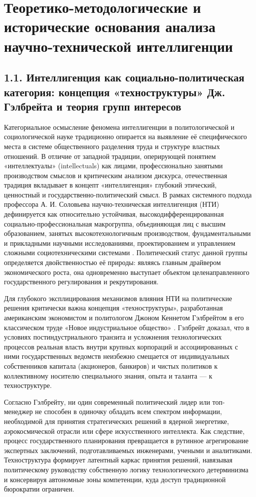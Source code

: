\section{Теоретико-методологические и исторические основания анализа научно-технической интеллигенции}

\subsection{1.1. Интеллигенция как социально-политическая категория: концепция «техноструктуры» Дж. Гэлбрейта и теория групп интересов}

Категориальное осмысление феномена интеллигенции в политологической и социологической науке традиционно опирается на выявление её специфического места в системе общественного разделения труда и структуре властных отношений. В отличие от западной традиции, оперирующей понятием «интеллектуалы» (intellectuals) как лицами, профессионально занятыми производством смыслов и критическим анализом дискурса, отечественная традиция вкладывает в концепт «интеллигенция» глубокий этический, ценностный и государственно-политический смысл. В рамках системного подхода профессора А. И. Соловьева научно-техническая интеллигенция (НТИ) дефинируется как относительно устойчивая, высокодифференцированная социально-профессиональная макрогруппа, объединяющая лиц с высшим образованием, занятых высокотехнологичным производством, фундаментальными и прикладными научными исследованиями, проектированием и управлением сложными социотехническими системами \cite{Solovyev}. Политический статус данной группы определяется двойственностью её природы: являясь главным драйвером экономического роста, она одновременно выступает объектом целенаправленного государственного регулирования и рекрутирования.

Для глубокого эксплицирования механизмов влияния НТИ на политические решения критически важна концепция «техноструктуры», разработанная американским экономистом и политологом Джоном Кеннетом Гэлбрейтом в его классическом труде «Новое индустриальное общество» \cite{Gelbreyt}. Гэлбрейт доказал, что в условиях постиндустриального транзита и усложнения технологических процессов реальная власть внутри крупных корпораций и ассоциированных с ними государственных ведомств неизбежно смещается от индивидуальных собственников капитала (акционеров, банкиров) и чистых политиков к коллективному носителю специального знания, опыта и таланта --- к техноструктуре. 

Согласно Гэлбрейту, ни один современный политический лидер или топ-менеджер не способен в одиночку обладать всем спектром информации, необходимой для принятия стратегических решений в ядерной энергетике, аэрокосмической отрасли или сфере искусственного интеллекта. Как следствие, процесс государственного планирования превращается в рутинное агрегирование экспертных заключений, подготавливаемых инженерами, учеными и аналитиками. Техноструктура формирует латентный каркас принятия решений, навязывая политическому руководству собственную логику технологического детерминизма и консервируя автономные зоны компетенции, куда доступ традиционной бюрократии ограничен.

